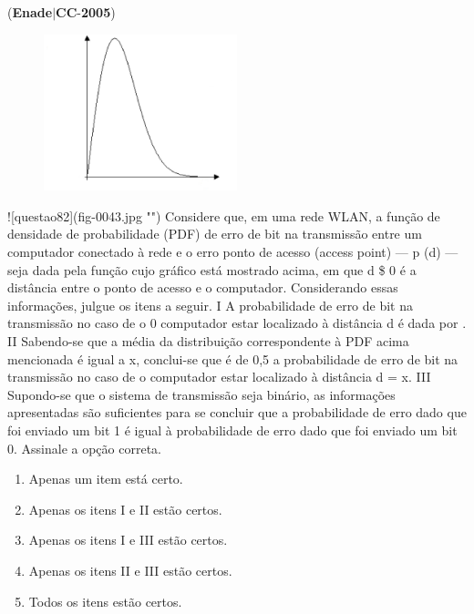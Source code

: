 \documentclass{exam}
\begin{document}
\begin{questions}
\question (\textbf{Enade}$|$\textbf{CC}-\textbf{2005}) \begin{figure}[H]
	\begin{center}
		\includegraphics[width=0.5\textwidth]{CIENCIA_DA_COMPUTACAO_Prova2005-utf8_figuras/fig-0043.jpg}
		\caption{}
	\end{center}
\end{figure}
![questao82](fig-0043.jpg "")
Considere que, em uma rede WLAN, a função de
densidade de probabilidade (PDF) de erro de bit na
transmissão entre um computador conectado à rede e o
erro
ponto de acesso (access point) — p (d) — seja dada
pela função cujo gráfico está mostrado acima, em que d
\$ 0 é a distância entre o ponto de acesso e o
computador.
Considerando essas informações, julgue os itens a seguir.
I A probabilidade de erro de bit na transmissão no caso de o
0
computador estar localizado à distância d é dada
por .
II Sabendo-se que a média da distribuição correspondente
à PDF acima mencionada é igual a x, conclui-se que é de
0,5 a probabilidade de erro de bit na transmissão no caso
de o computador estar localizado à distância d = x.
III Supondo-se que o sistema de transmissão seja binário, as
informações apresentadas são suficientes para se
concluir que a probabilidade de erro dado que foi enviado
um bit 1 é igual à probabilidade de erro dado que foi
enviado um bit 0.
Assinale a opção correta.
	\begin{enumerate}[label=\alph*)]
		\item  Apenas um item está certo.
		\item  Apenas os itens I e II estão certos.
		\item  Apenas os itens I e III estão certos.
		\item  Apenas os itens II e III estão certos.
		\item  Todos os itens estão certos.

	\end{enumerate}


\end{questions}
\end{document}
